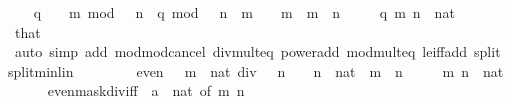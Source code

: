 \begin{isabellebody}
\isanewline
\ \ \isamarkupfalse%
\ {\isacartoucheopen}{\isacharparenleft}{\kern0pt}q\ {\isacharasterisk}{\kern0pt}\ {}\ {\isacharcircum}{\kern0pt}\ m{\isacharparenright}{\kern0pt}\ mod\ {\isacharparenleft}{\kern0pt}{}\ {\isacharcircum}{\kern0pt}\ n{\isacharparenright}{\kern0pt}\ {\isacharequal}{\kern0pt}\ {\isacharparenleft}{\kern0pt}q\ mod\ {}\ {\isacharcircum}{\kern0pt}\ {\isacharparenleft}{\kern0pt}n\ {\isacharminus}{\kern0pt}\ m{\isacharparenright}{\kern0pt}{\isacharparenright}{\kern0pt}\ {\isacharasterisk}{\kern0pt}\ {}\ {\isacharcircum}{\kern0pt}\ m{\isacartoucheclose}\ \ {\isacartoucheopen}m\ {\isasymle}\ n{\isacartoucheclose}\isanewline
\ \ \ \ \ q\ m\ n\ {\isacharcolon}{\kern0pt}{\isacharcolon}{\kern0pt}\ nat\isanewline
\ \ \ \ \isamarkupfalse%
\ that\isanewline
\ \ \ \ \isamarkupfalse%
\ {\isacharparenleft}{\kern0pt}auto\ simp\ add{\isacharcolon}{\kern0pt}\ mod{\isacharunderscore}{\kern0pt}mod{\isacharunderscore}{\kern0pt}cancel\ div{\isacharunderscore}{\kern0pt}mult{}{\isacharunderscore}{\kern0pt}eq\ power{\isacharunderscore}{\kern0pt}add\ mod{\isacharunderscore}{\kern0pt}mult{}{\isacharunderscore}{\kern0pt}eq\ le{\isacharunderscore}{\kern0pt}iff{\isacharunderscore}{\kern0pt}add\ split{\isacharcolon}{\kern0pt}\ split{\isacharunderscore}{\kern0pt}min{\isacharunderscore}{\kern0pt}lin{\isacharparenright}{\kern0pt}\isanewline
\ \ \ \ \isamarkupfalse%
\isanewline
\ \ \isamarkupfalse%
\ {\isacartoucheopen}even\ {\isacharparenleft}{\kern0pt}{\isacharparenleft}{\kern0pt}{}\ {\isacharcircum}{\kern0pt}\ m\ {\isacharminus}{\kern0pt}\ {\isacharparenleft}{\kern0pt}{}{\isacharcolon}{\kern0pt}{\isacharcolon}{\kern0pt}nat{\isacharparenright}{\kern0pt}{\isacharparenright}{\kern0pt}\ div\ {}\ {\isacharcircum}{\kern0pt}\ n{\isacharparenright}{\kern0pt}\ {\isasymlongleftrightarrow}\ {}\ {\isacharcircum}{\kern0pt}\ n\ {\isacharequal}{\kern0pt}\ {\isacharparenleft}{\kern0pt}{}{\isacharcolon}{\kern0pt}{\isacharcolon}{\kern0pt}nat{\isacharparenright}{\kern0pt}\ {\isasymor}\ m\ {\isasymle}\ n{\isacartoucheclose}\isanewline
\ \ \ \ \ m\ n\ {\isacharcolon}{\kern0pt}{\isacharcolon}{\kern0pt}\ nat\isanewline
\ \ \ \ \isamarkupfalse%
\ even{\isacharunderscore}{\kern0pt}mask{\isacharunderscore}{\kern0pt}div{\isacharunderscore}{\kern0pt}iff{\isacharprime}{\kern0pt}\ {\isacharbrackleft}{\kern0pt}\ {\isacharquery}{\kern0pt}{\isacharprime}{\kern0pt}a\ {\isacharequal}{\kern0pt}\ nat{\isacharcomma}{\kern0pt}\ of\ m\ n{\isacharbrackright}{\kern0pt}\ \isamarkupfalse%

\end{isabellebody}
